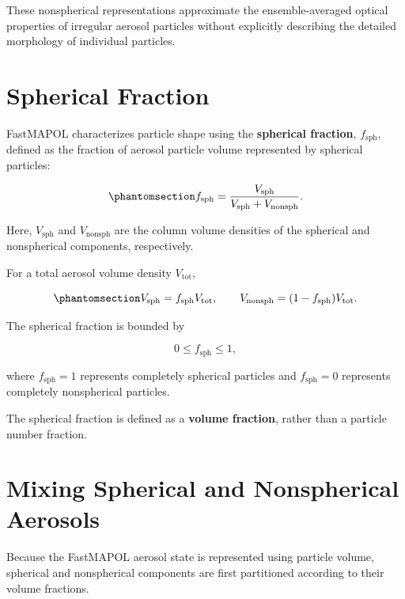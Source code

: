 \documentclass[
  11pt,
  letterpaper,
]{scrreprt}
\begin{document}
These nonspherical representations approximate the ensemble-averaged
optical properties of irregular aerosol particles without explicitly
describing the detailed morphology of individual particles.

\section{Spherical Fraction}\label{spherical-fraction}

FastMAPOL characterizes particle shape using the \textbf{spherical
fraction}, \(f_{\mathrm{sph}}\), defined as the fraction of aerosol
particle volume represented by spherical particles:

\begin{equation}\phantomsection\label{eq-spherical-fraction}{
f_{\mathrm{sph}}
=
\frac{V_{\mathrm{sph}}}
{V_{\mathrm{sph}}+V_{\mathrm{nonsph}}}.
}\end{equation}

Here, \(V_{\mathrm{sph}}\) and \(V_{\mathrm{nonsph}}\) are the column
volume densities of the spherical and nonspherical components,
respectively.

For a total aerosol volume density \(V_{\mathrm{tot}}\),

\begin{equation}\phantomsection\label{eq-shape-volume}{
V_{\mathrm{sph}}
=
f_{\mathrm{sph}} V_{\mathrm{tot}},
\qquad
V_{\mathrm{nonsph}}
=
(1-f_{\mathrm{sph}})V_{\mathrm{tot}}.
}\end{equation}

The spherical fraction is bounded by

\[
0 \le f_{\mathrm{sph}} \le 1,
\]

where \(f_{\mathrm{sph}}=1\) represents completely spherical particles
and \(f_{\mathrm{sph}}=0\) represents completely nonspherical particles.

The spherical fraction is defined as a \textbf{volume fraction}, rather
than a particle number fraction.

\section{Mixing Spherical and Nonspherical
Aerosols}\label{mixing-spherical-and-nonspherical-aerosols}

Because the FastMAPOL aerosol state is represented using particle
volume, spherical and nonspherical components are first partitioned
according to their volume fractions.
\end{document}
